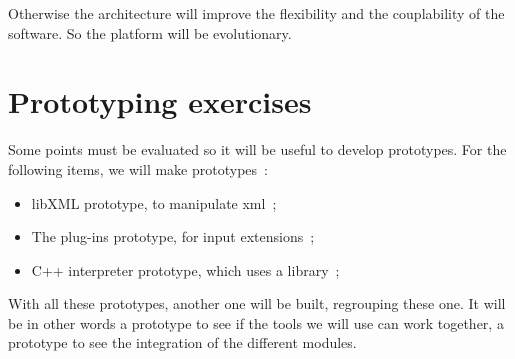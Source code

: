 Otherwise the architecture will improve the flexibility and the couplability of the software. So the platform will be evolutionary.


\section{Prototyping exercises}
Some points must be evaluated so it will be useful to develop prototypes. For the following items, we will make prototypes~:
\begin{itemize}
        \item libXML prototype, to manipulate \ac{xml}~;
        \item The plug-ins prototype, for input extensions~;
        \item C++ interpreter prototype, which uses a library~;
\end{itemize}

With all these prototypes, another one will be built, regrouping these one. It will be in other words a prototype to see if the
tools we will use can work together, a prototype to see the integration of the different modules.
